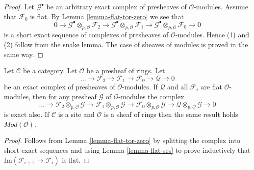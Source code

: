 \begin{proof}
Let $\mathcal{G}^\bullet$ be an arbitrary exact complex of presheaves
of $\mathcal{O}$-modules. Assume that $\mathcal{F}_0$ is flat.
By Lemma \ref{lemma-flat-tor-zero} we see that
$$
0 \to
\mathcal{G}^\bullet \otimes_{p, \mathcal{O}} \mathcal{F}_2 \to
\mathcal{G}^\bullet \otimes_{p, \mathcal{O}} \mathcal{F}_1 \to
\mathcal{G}^\bullet \otimes_{p, \mathcal{O}} \mathcal{F}_0 \to 0
$$
is a short exact sequence of complexes of presheaves of
$\mathcal{O}$-modules. Hence (1) and (2) follow from the snake lemma.
The case of sheaves of modules is proved in the same way.
\end{proof}

\begin{lemma}
\label{lemma-flat-resolution-of-flat}
Let $\mathcal{C}$ be a category.
Let $\mathcal{O}$ be a presheaf of rings.
Let
$$
\ldots \to
\mathcal{F}_2 \to
\mathcal{F}_1 \to
\mathcal{F}_0 \to
\mathcal{Q} \to 0
$$
be an exact complex of presheaves of $\mathcal{O}$-modules.
If $\mathcal{Q}$ and all $\mathcal{F}_i$ are flat $\mathcal{O}$-modules,
then for any presheaf $\mathcal{G}$ of $\mathcal{O}$-modules the
complex
$$
\ldots \to
\mathcal{F}_2 \otimes_{p, \mathcal{O}} \mathcal{G} \to
\mathcal{F}_1 \otimes_{p, \mathcal{O}} \mathcal{G} \to
\mathcal{F}_0 \otimes_{p, \mathcal{O}} \mathcal{G} \to
\mathcal{Q} \otimes_{p, \mathcal{O}} \mathcal{G} \to 0
$$
is exact also. If $\mathcal{C}$ is a site and $\mathcal{O}$ is a
sheaf of rings then the same result holds $\textit{Mod}(\mathcal{O})$.
\end{lemma}

\begin{proof}
Follows from Lemma \ref{lemma-flat-tor-zero} by splitting the complex
into short exact sequences and using Lemma \ref{lemma-flat-ses} to
prove inductively that $\text{Im}(\mathcal{F}_{i + 1} \to \mathcal{F}_i)$
is flat.
\end{proof}



























